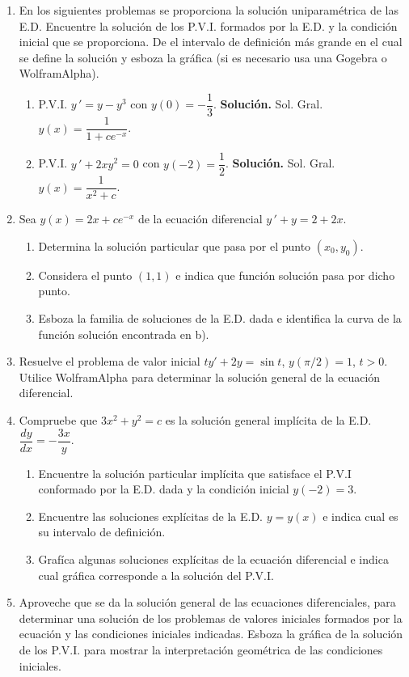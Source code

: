 \documentclass[letterpaper,10pt]{memoir}
\begin{document}
\titulo

\begin{enumerate}
	\item En los siguientes problemas se proporciona la solución uniparamétrica de las E.D. Encuentre la solución de los P.V.I. formados por la E.D. y la condición inicial que se proporciona. De el intervalo de definición más grande en el cual se define la solución y esboza la gráfica (si es necesario usa una Gogebra o WolframAlpha).
		\begin{enumerate}
			\item P.V.I. \(y \,' =y-y^3\) con \(y(0) =- \dfrac{1}{3}\). \textbf{Solución.} Sol. Gral. \(y(x) = \dfrac{1}{1+ce^{-x}}\).
			\item P.V.I. \(y \,' +2xy^2=0\) con \(y(-2) = \dfrac{1}{2}\). \textbf{Solución.} Sol. Gral. \(y(x) = \dfrac{1}{x^2+c}\).
		\end{enumerate}
	\item Sea \(y(x) =2x+ce^{-x}\) de la ecuación diferencial \(y \,' +y=2+2x\).
		\begin{enumerate}
			\item Determina la solución particular que pasa por el punto \((x_0,y_0)\).
			\item Considera el punto \((1,1)\) e indica que función solución pasa por dicho punto.
			\item Esboza la familia de soluciones de la E.D. dada e identifica la curva de la función solución encontrada en b).
		\end{enumerate}
	\item Resuelve el problema de valor inicial \(ty'+2y= \sin  t\), \(y(\pi /2)=1\), \(t>0\).  Utilice WolframAlpha para determinar la solución general de la ecuación diferencial.
	\item Compruebe que \(3x^2+y^2=c\) es la solución general implícita de la E.D. \(\dfrac{dy}{dx} =- \dfrac{3x}{y}\).
		\begin{enumerate}
			\item Encuentre la solución particular implícita que satisface el P.V.I conformado por la E.D. dada y la condición inicial \(y(-2) =3\).
			\item Encuentre las soluciones explícitas  de la E.D. \(y=y(x)\) e indica cual es su intervalo de definición.
			\item Grafíca algunas soluciones explícitas de la ecuación diferencial e indica cual gráfica corresponde a la solución del P.V.I.
		\end{enumerate}
	\item Aproveche que se da la solución general de las ecuaciones diferenciales, para determinar una solución de los problemas de valores iniciales formados por la ecuación y las condiciones iniciales indicadas. Esboza la gráfica de la solución de los P.V.I. para mostrar la interpretación geométrica de las condiciones iniciales.

\end{enumerate}
\end{document}
